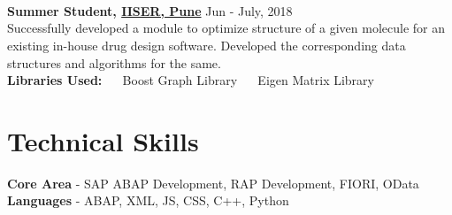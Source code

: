 \documentclass[margin, centered, a4paper]{res}
\begin{document}
\begin{resume}
\begin{tabular}{ l l l }
\end{tabular}\\
\\
\\
\textbf{Summer Student, \href{http://www.iiserpune.ac.in/}{IISER, Pune}} \hfill{Jun - July, 2018}\\
Successfully developed a module to optimize structure of a given molecule for an existing in-house drug design software. Developed the corresponding data structures and algorithms for the same.\\
\textbf{Libraries Used:} ~\textbullet~ Boost Graph Library ~\textbullet~ Eigen Matrix Library\\

\section{Technical Skills}
\textbf{Core Area} - SAP ABAP Development, RAP Development, FIORI, OData\\
\textbf{Languages} - ABAP, XML, JS, CSS, C++, Python\\


\end{resume}
\end{document}
